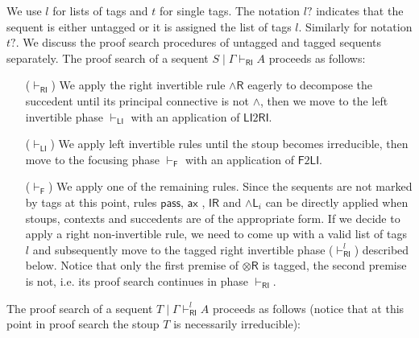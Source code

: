 \documentclass[submission,copyright,creativecommons]{eptcs}
\theoremstyle{definition}
\newcommand{\tr}{\otimes \mathsf{R}}
\newcommand{\pass}{\mathsf{pass}}
\newcommand{\unitr}{\mathsf{IR}}
\newcommand{\andli}{\land \mathsf{L}_{i}}
\newcommand{\andr}{\land \mathsf{R}}
\newcommand{\ax}{\mathsf{ax}}
\newcommand{\RI}{\mathsf{RI}}
\newcommand{\LI}{\mathsf{LI}}
\newcommand{\Pass}{\mathsf{P}}
\newcommand{\F}{\mathsf{F}}
\begin{document}
We use $l$ for lists of tags and $t$ for single tags.
The notation $l?$ indicates that the sequent is either untagged or it is assigned the list of tags $l$. Similarly for notation $t?$.
We discuss the proof search procedures of untagged and tagged sequents separately.
The proof search of a sequent $S \mid \Gamma \vdash_\RI A$ proceeds as follows:
\begin{itemize}
  \item[($\vdash_{\RI}$)] We apply the right invertible rule $\andr$ eagerly to decompose the succedent until its principal connective is not $\land$, then we move to the left invertible phase $\vdash_\LI$ with an application of $\LI 2 \RI$.
  \item[($\vdash_{\LI}$)] We apply left invertible rules until the stoup becomes irreducible, then move to the focusing phase $\vdash_\F$ with an application of $\F 2 \LI$.
  \item[($\vdash_{\F}$)] We apply one of the remaining rules. Since the sequents are not marked by tags at this point, rules $\pass$, $\ax$ , $\unitr$ and $\andli$ can be directly applied when stoups, contexts and succedents are of the appropriate form.
  If we decide to apply a right non-invertible rule, we need to come up with a valid list of tags $l$ and subsequently move to the tagged right invertible phase ($\vdash^{l}_{\RI}$) described below. Notice that only the first premise of $\tr$ is tagged, the second premise is not, i.e. its proof search continues in phase $\vdash_{\RI}$.
\end{itemize}
The proof search of a sequent $T \mid \Gamma \vdash^{l}_\RI A$ proceeds as follows (notice that at this point in proof search the stoup $T$ is necessarily irreducible):
\end{document}
